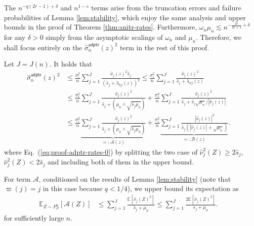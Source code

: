 \documentclass[11pt,a4paper]{article}
\renewcommand{\hat}{\widehat}
\theoremstyle{definition}
\theoremstyle{plain}
\theoremstyle{remark}
\newcommand{\mA}{\mathcal A}
\newcommand{\mB}{\mathcal B}
\newcommand{\adptr}{\mathsf{adptr}}
\begin{document}
The $n^{-q(2r-1)+\delta}$ and $n^{1-c}$ terms arise from the truncation errors and failure probabilities of Lemma \ref{lem:stability}, which enjoy the same analysis and upper bounds
in the proof of Theorem \ref{thm:anitr-rates}.
Furthermore, $\omega_n\mu_n\lesssim n^{-\frac{2r}{2r+1}+\delta}$ for any $\delta>0$ simply from the asymptotic scalings of $\omega_n$ and $\mu_n$.
Therefore, we shall focus entirely on the $\hat\sigma_n^\adptr(z)^2$ term in the rest of this proof.

Let $J=J(n)$.
It holds that
\begin{align}
\hat\sigma_n^\adptr(z)^2 &\leq \frac{\sigma_\varepsilon^2}{n}\sum_{j=1}^J\frac{\hat\nu_j(z)^2\hat s_j}{(\hat s_j+\lambda_{nj}(z))^2} \leq \frac{\sigma_\varepsilon^2}{n}\sum_{j=1}^J\frac{\hat\nu_j(z)^2}{\hat s_j+\lambda_{nj}(z)}\nonumber\\
&\leq \frac{\sigma_\varepsilon^2}{n}\sum_{j=1}^J\frac{\hat\nu_j(z)^2}{\hat s_j+(\mu_n\wedge\sqrt{\hat s_j\mu_n})} + \frac{\sigma_\varepsilon^2}{n}\sum_{j=1}^J\frac{\hat\nu_j(z)^2}{\hat s_j+\hat s_j\sqrt{\mu_n}/|\hat\nu_j(z)|} \label{eq:proof-adptr-rates-0}\\
&\leq  \frac{\sigma_\varepsilon^2}{n}\underbrace{\sum_{j=1}^J\frac{\hat\nu_j(z)^2}{\hat s_j+(\mu_n\wedge\sqrt{\hat s_j\mu_n})}}_{=:\mA(z)} + \frac{\sigma_\varepsilon^2}{n}\underbrace{\sum_{j=1}^J\frac{|\hat\nu_j(z)|^3}{\hat s_j(|\hat\nu_j(z)|+\sqrt{\mu_n})}}_{=:\mB(z)}.
\label{eq:proof-adptr-rates-1}
\end{align}
where Eq.~(\ref{eq:proof-adptr-rates-0}) by splitting the two case of $\hat\nu_j^2(Z)\geq 2\hat s_j$, $\hat\nu_j^2(Z)<2\hat s_j$ and including both of them in the upper bound.

For term $\mA$, conditioned on the results of Lemma \ref{lem:stability} (note that $\varpi(j)=j$ in this case because $q<1/4$), we upper bound its expectation as
\begin{align}
\mathbb E_{Z\sim P_Z^n}[\mA(Z)] &\leq \sum_{j=1}^J \frac{\mathbb E[\hat\nu_j(Z)^2]}{\hat s_j + \mu_n} \leq \sum_{j=1}^J\frac{2\mathbb E[\hat\nu_j(Z)^2]}{s_j+\mu_n}.\label{eq:proof-adptr-sp1}
\end{align}
for sufficiently large $n$.
\end{document}
